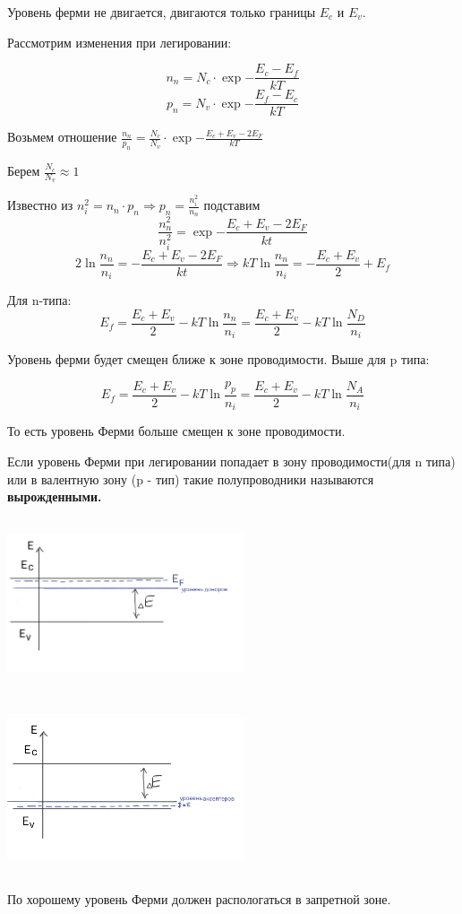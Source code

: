 \documentclass[../main.tex]{subfiles}
\begin{document}
Уровень ферми не двигается, двигаются только границы $E_c$ и $E_v$.

Рассмотрим изменения при легировании: 

\[ n_n = N_c \cdot \exp{-\frac{E_c - E_f}{kT}} \]
\[ p_n = N_v \cdot \exp{-\frac{E_f - E_c}{kT}} \]

Возьмем отношение $\frac{n_n}{p_n} = \frac{N_c}{N_v} \cdot \exp{- \frac{E_c + E_v - 2E_F}{kT}}$

Берем $\frac{N_c}{N_v} \approx 1$ 

Известно из $n_i^2 = n_n \cdot p_n \Rightarrow p_n = \frac{n_i^2}{n_n}$ подставим 
\[\frac{n_n^2}{n_i^2} = \exp{- \frac{E_c + E_v - 2E_F}{kt}}\]
\[2 \ln{\frac{n_n}{n_i}} = - \frac{E_c + E_v - 2E_F}{kt} \Rightarrow kT \ln{\frac{n_n}{n_i} = - \frac{E_c + E_v}{2} +E_f}\]

Для n-типа:
\[
\boxed{
E_f = \frac{E_c + E_v}{2}
- kT \ln{\frac{n_n}{n_i}}
= \frac{E_c + E_v}{2}
- kT \ln{\frac{N_D}{n_i}}
}
\]

Уровень ферми будет смещен ближе к зоне проводимости. Выше для p типа: 

\[
\boxed{
E_f = \frac{E_c + E_v}{2}
- kT \ln{\frac{p_p}{n_i}}
= \frac{E_c + E_v}{2}
- kT \ln{\frac{N_A}{n_i}}
}
\]

То есть уровень Ферми больше смещен к зоне проводимости.

 Если уровень Ферми при легировании попадает в зону проводимости(для n типа) 
или в валентную зону (p - тип) такие полупроводники называются \textbf{вырожденными.}

\begin{center}
    \includegraphics[height=5cm, width=7cm]{../img/kvantovy27.png}
\end{center}
\begin{center}
    \includegraphics[height=5cm, width=7cm]{../img/kvantovy28.png}
\end{center}
По хорошему уровень Ферми должен распологаться в запретной зоне.
\end{document}
